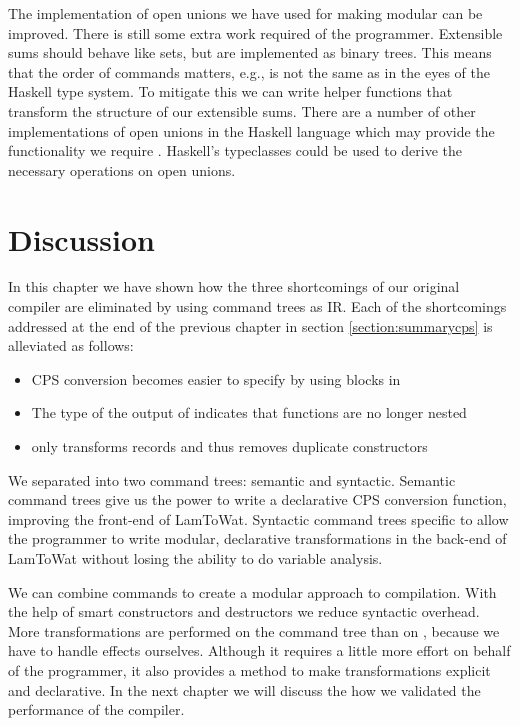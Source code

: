 The implementation of open unions we have used for making  modular can be improved. There is still some extra work required of the programmer. Extensible sums should behave like sets, but are implemented as binary trees. This means that the order of commands matters, e.g.,  is not the same as  in the eyes of the Haskell type system. To mitigate this we can write helper functions that transform the structure of our extensible sums. There are a number of other implementations of open unions in the Haskell language which may provide the functionality we require \autocite{extensible-effects, open-union}. Haskell's typeclasses could be used to derive the necessary operations on open unions.

\section{\label{section:summarytree}Discussion}
In this chapter we have shown how the three shortcomings of our original compiler are eliminated by using command trees as IR. Each of the shortcomings addressed at the end of the previous chapter in section \ref{section:summarycps} is alleviated as follows: 

\begin{itemize}
\item CPS conversion becomes easier to specify by using blocks in 
\item The type of the output of  indicates that functions are no longer nested
\item {} only transforms records and thus removes duplicate constructors
\end{itemize}

We separated  into two command trees: semantic and syntactic. Semantic command trees give us the power to write a declarative CPS conversion function, improving the front-end of LamToWat. Syntactic command trees specific to  allow the programmer to write modular, declarative transformations in the back-end of LamToWat without losing the ability to do variable analysis.

We can combine commands to create a modular approach to compilation. With the help of smart constructors and destructors we reduce syntactic overhead. More transformations are performed on the command tree than on , because we have to handle effects ourselves. Although it requires a little more effort on behalf of the programmer, it also provides a method to make transformations explicit and declarative. In the next chapter we will discuss the how we validated the performance of the compiler.
